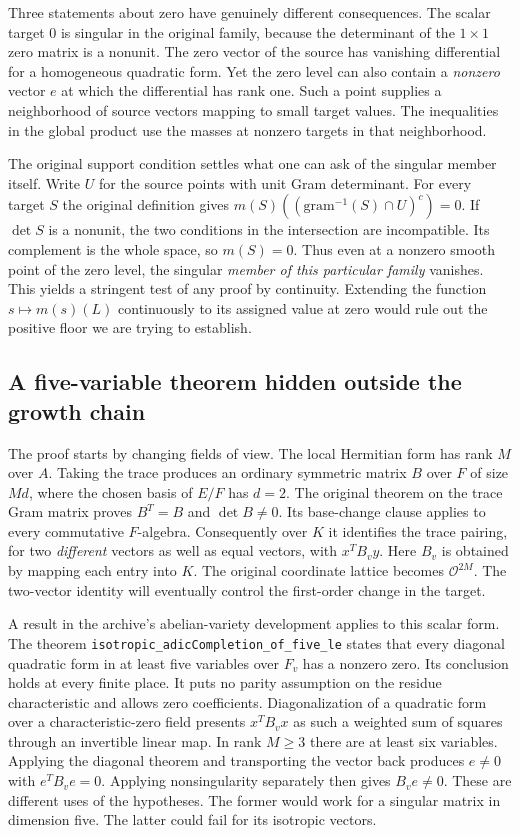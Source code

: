 \documentclass[12pt,letterpaper]{article}
\begin{document}
Three statements about zero have genuinely different consequences. The scalar target $0$ is singular in the original family, because the determinant of the $1\times1$ zero matrix is a nonunit. The zero vector of the source has vanishing differential for a homogeneous quadratic form. Yet the zero level can also contain a \emph{nonzero} vector $e$ at which the differential has rank one. Such a point supplies a neighborhood of source vectors mapping to small target values. The inequalities in the global product use the masses at nonzero targets in that neighborhood.

The original support condition settles what one can ask of the singular member itself. Write $U$ for the source points with unit Gram determinant. For every target $S$ the original definition gives $m(S)((\mathrm{gram}^{-1}(S)\cap U)^c)=0$. If $\det S$ is a nonunit, the two conditions in the intersection are incompatible. Its complement is the whole space, so $m(S)=0$. Thus even at a nonzero smooth point of the zero level, the singular \emph{member of this particular family} vanishes. This yields a stringent test of any proof by continuity. Extending the function $s\mapsto m(s)(L)$ continuously to its assigned value at zero would rule out the positive floor we are trying to establish.

\subsection{A five-variable theorem hidden outside the growth chain}

The proof starts by changing fields of view. The local Hermitian form has rank $M$ over $A$. Taking the trace produces an ordinary symmetric matrix $B$ over $F$ of size $Md$, where the chosen basis of $E/F$ has $d=2$. The original theorem on the trace Gram matrix proves $B^T=B$ and $\det B\ne0$. Its base-change clause applies to every commutative $F$-algebra. Consequently over $K$ it identifies the trace pairing, for two \emph{different} vectors as well as equal vectors, with $x^TB_vy$. Here $B_v$ is obtained by mapping each entry into $K$. The original coordinate lattice becomes $\mathcal O^{2M}$. The two-vector identity will eventually control the first-order change in the target.

A result in the archive's abelian-variety development applies to this scalar form. The theorem \texttt{isotropic\_adicCompletion\_of\_five\_le} states that every diagonal quadratic form in at least five variables over $F_v$ has a nonzero zero. Its conclusion holds at every finite place. It puts no parity assumption on the residue characteristic and allows zero coefficients. Diagonalization of a quadratic form over a characteristic-zero field presents $x^TB_vx$ as such a weighted sum of squares through an invertible linear map. In rank $M\ge3$ there are at least six variables. Applying the diagonal theorem and transporting the vector back produces $e\ne0$ with $e^TB_ve=0$. Applying nonsingularity separately then gives $B_ve\ne0$. These are different uses of the hypotheses. The former would work for a singular matrix in dimension five. The latter could fail for its isotropic vectors.
\end{document}
